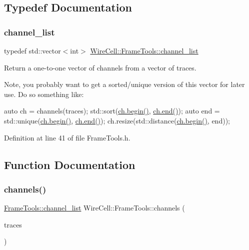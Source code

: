 \subsection{Typedef Documentation}
\mbox{\label{namespace_wire_cell_1_1_frame_tools_aaf07539dac296588f9004b525f940e67}} 
\subsubsection{\texorpdfstring{channel\+\_\+list}{channel\_list}}
{\footnotesize\ttfamily typedef std\+::vector$<$int$>$ \hyperlink{namespace_wire_cell_1_1_frame_tools_aaf07539dac296588f9004b525f940e67}{Wire\+Cell\+::\+Frame\+Tools\+::channel\+\_\+list}}

Return a one-\/to-\/one vector of channels from a vector of traces.

Note, you probably want to get a sorted/unique version of this vector for later use. Do so something like\+:

auto ch = channels(traces); std\+::sort(\hyperlink{namespaceinternal_a265f36d9dee68d3f44381347ef2fd5cb}{ch.\+begin()}, \hyperlink{namespaceinternal_a94820de1710dc8038fa6f188adfe299b}{ch.\+end()}); auto end = std\+::unique(\hyperlink{namespaceinternal_a265f36d9dee68d3f44381347ef2fd5cb}{ch.\+begin()}, \hyperlink{namespaceinternal_a94820de1710dc8038fa6f188adfe299b}{ch.\+end()}); ch.\+resize(std\+::distance(\hyperlink{namespaceinternal_a265f36d9dee68d3f44381347ef2fd5cb}{ch.\+begin()}, end)); 

Definition at line 41 of file Frame\+Tools.\+h.



\subsection{Function Documentation}
\mbox{\label{namespace_wire_cell_1_1_frame_tools_aa68b64d0bc1fd1daa0646a35c26edcbb}} 
\subsubsection{\texorpdfstring{channels()}{channels()}}
{\footnotesize\ttfamily \hyperlink{namespace_wire_cell_1_1_frame_tools_aaf07539dac296588f9004b525f940e67}{Frame\+Tools\+::channel\+\_\+list} Wire\+Cell\+::\+Frame\+Tools\+::channels (\begin{DoxyParamCaption}\item[{const \hyperlink{class_wire_cell_1_1_i_data_ae1a9f863380499bb43f39fabb6276660}{I\+Trace\+::vector} \&}]{traces }\end{DoxyParamCaption})}



